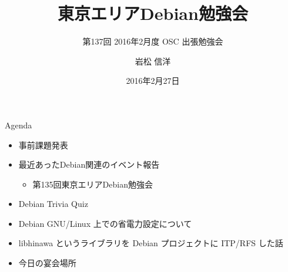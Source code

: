 \title{東京エリアDebian勉強会}
\subtitle{第137回 2016年2月度 OSC 出張勉強会}
\author{岩松 信洋}
\date{2016年2月27日}



\begin{frame}
\titlepage{}
\end{frame}

\begin{frame}{Agenda}
 \begin{minipage}[t]{0.45\hsize}
  \begin{itemize}
   \item 事前課題発表
   \item 最近あったDebian関連のイベント報告
	 \begin{itemize}
	 \item 第135回東京エリアDebian勉強会
	 \end{itemize}
  \end{itemize}
 \end{minipage} 
 \begin{minipage}[t]{0.45\hsize}
  \begin{itemize}
   \item Debian Trivia Quiz
   \item Debian GNU/Linux 上での省電力設定について
   \item libhinawa というライブラリを Debian プロジェクトに ITP/RFS した話
   \item 今日の宴会場所
  \end{itemize}
 \end{minipage}
\end{frame}

